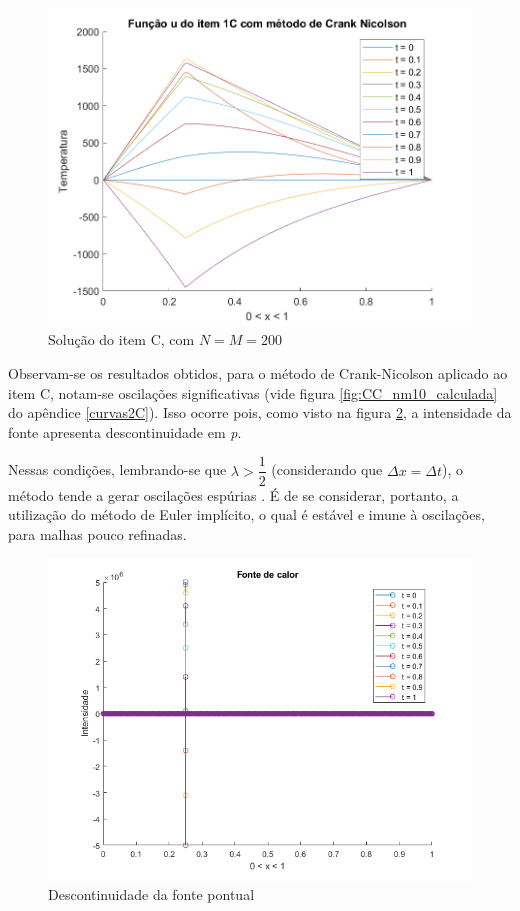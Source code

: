 \documentclass[12pt]{article}
\begin{document}
\begin{spacing}{1.5}
\begin{figure}[ht!]
    \centering
    \includegraphics[width=0.45\linewidth]{Segunda_Tarefa/ItemC/itemC_2D.png}
    \caption{Solução do item C, com $N=M=200$}
    \label{fig:Tarefa2C_itemC_2D}
\end{figure}

\clearpage
Observam-se os resultados obtidos, para o método de Crank-Nicolson aplicado ao item C, notam-se oscilações significativas (vide figura \ref{fig:CC_nm10_calculada} do apêndice \ref{curvas2C}). Isso ocorre pois, como visto na figura \ref{fig:fonte_pontual}, a intensidade da fonte apresenta descontinuidade em \textit{p}. 

Nessas condições, lembrando-se que $\lambda > \dfrac{1}{2}$ (considerando que $\Delta x = \Delta t$), o método tende a gerar oscilações espúrias \supercite{osterby}. É de se considerar, portanto, a utilização do método de Euler implícito, o qual é estável e imune à oscilações, para malhas pouco refinadas.

\vspace{1cm}
\begin{figure}[ht]
    \centering
    \includegraphics[width=0.8\linewidth]{Segunda_Tarefa/ItemC/fonte.png}
    \caption{Descontinuidade da fonte pontual}
    \label{fig:fonte_pontual}
\end{figure}



\end{spacing}
\end{document}
